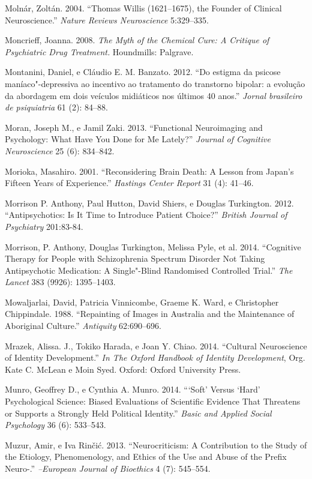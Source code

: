 Molnár, Zoltán. 2004. ``Thomas Willis (1621--1675), the Founder of
Clinical Neuroscience.'' \emph{Nature Reviews Neuroscience} 5:329--335.

Moncrieff, Joanna. 2008. \emph{The Myth of the Chemical Cure: A Critique
of Psychiatric Drug Treatment.} Houndmills: Palgrave.

Montanini, Daniel, e Cláudio E. M. Banzato. 2012. ``Do estigma da
psicose maníaco"-depressiva ao incentivo ao tratamento do transtorno
bipolar: a evolução da abordagem em dois veículos midiáticos nos últimos
40 anos.'' \emph{Jornal brasileiro de psiquiatria} 61 (2): 84--88.

Moran, Joseph M., e Jamil Zaki. 2013. ``Functional Neuroimaging and
Psychology: What Have You Done for Me Lately?'' \emph{Journal of
Cognitive Neuroscience} 25 (6): 834--842.

Morioka, Masahiro. 2001. ``Reconsidering Brain Death: A Lesson from
Japan's Fifteen Years of Experience.'' \emph{Hastings Center Report} 31
(4): 41--46.

Morrison P. Anthony, Paul Hutton, David Shiers, e Douglas Turkington.
2012. ``Antipsychotics: Is It Time to Introduce Patient Choice?''
\emph{British Journal of Psychiatry} 201:83-84.

Morrison, P. Anthony, Douglas Turkington, Melissa Pyle, et al. 2014.
``Cognitive Therapy for People with Schizophrenia Spectrum Disorder Not
Taking Antipsychotic Medication: A Single"-Blind Randomised Controlled
Trial.'' \emph{The Lancet} 383 (9926): 1395--1403.

Mowaljarlai, David, Patricia Vinnicombe, Graeme K. Ward, e Christopher
Chippindale. 1988. ``Repainting of Images in Australia and the
Maintenance of Aboriginal Culture.'' \emph{Antiquity} 62:690--696.

Mrazek, Alissa. J., Tokiko Harada, e Joan Y. Chiao. 2014. ``Cultural
Neuroscience of Identity Development.'' \emph{In The Oxford Handbook of
Identity Development}, Org. Kate C. McLean e Moin Syed. Oxford: Oxford
University Press.

Munro, Geoffrey D., e Cynthia A. Munro. 2014. ```Soft' Versus `Hard'
Psychological Science: Biased Evaluations of Scientific Evidence That
Threatens or Supports a Strongly Held Political Identity.'' \emph{Basic
and Applied Social Psychology} 36 (6): 533--543.

Muzur, Amir, e Iva Rinčić. 2013. ``Neurocriticism: A Contribution to the
Study of the Etiology, Phenomenology, and Ethics of the Use and Abuse of
the Prefix Neuro-.'' \emph{--European Journal of Bioethics} 4 (7):
545--554.


